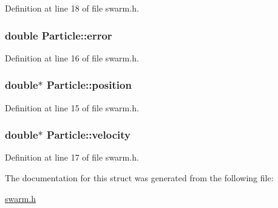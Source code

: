 Definition at line 18 of file swarm.\-h.

\hypertarget{structParticle_a0a7996980f49aae07b094f3ce0f35ef2}{
\subsubsection[{error}]{\setlength{\rightskip}{0pt plus 5cm}double Particle\-::error}}\label{structParticle_a0a7996980f49aae07b094f3ce0f35ef2}


Definition at line 16 of file swarm.\-h.

\hypertarget{structParticle_ae3022a2f22a4b538d6637c54d5072cc6}{
\subsubsection[{position}]{\setlength{\rightskip}{0pt plus 5cm}double$\ast$ Particle\-::position}}\label{structParticle_ae3022a2f22a4b538d6637c54d5072cc6}


Definition at line 15 of file swarm.\-h.

\hypertarget{structParticle_a7d8ccf7f88745286635bfcd97bff393c}{
\subsubsection[{velocity}]{\setlength{\rightskip}{0pt plus 5cm}double$\ast$ Particle\-::velocity}}\label{structParticle_a7d8ccf7f88745286635bfcd97bff393c}


Definition at line 17 of file swarm.\-h.



The documentation for this struct was generated from the following file\-:\begin{DoxyCompactItemize}
\item 
\hyperlink{swarm_8h}{swarm.\-h}\end{DoxyCompactItemize}
